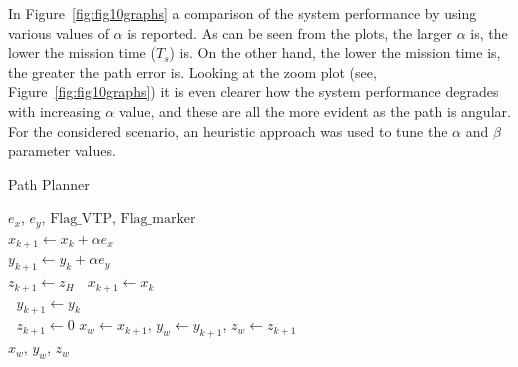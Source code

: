 \documentclass[a4paper,twocolumn,10pt]{article}
\begin{document}
    In Figure~\ref{fig:fig10graphs} a comparison of the system performance by using various values of $\alpha$ is reported. As can be seen from the plots, the larger $\alpha$ is, the lower the mission time ($T_s$) is. On the other hand, the lower the mission time is, the greater the path 
    error is. Looking at the zoom plot (see, Figure~\ref{fig:fig10graphs}) it is even clearer how the system performance degrades with increasing $\alpha$ value, and these are all the more evident as the path is angular. For the considered scenario, an heuristic approach was used to tune the $\alpha$ and $\beta$ parameter values.

    \begin{algorithm}
        \caption{Path Planner}
        \label{alg:pathPlanAlg}
        $e_x$, $e_y$, $\text{Flag\_VTP}$, $\text{Flag\_marker}$ \\
         {
            \quad $x_{k+1} \gets x_k + \alpha e_x$\\
            \quad $y_{k+1} \gets y_k + \alpha e_y$\\
            \quad $z_{k+1} \gets  z_H$
        }
         {
             {
            \qquad $\;$ $x_{k+1}  \gets x_k $\\
            \qquad $\;$ $y_{k+1} \gets y_k $\\
            \qquad $\;$ $z_{k+1} \gets 0$
            }
        }
        $x_w \gets x_{k+1}$, $y_w \gets y_{k+1}$, $z_w \gets z_{k+1}$ \\
        \Return $x_w$, $y_w$, $z_w$
    \end{algorithm} 
\end{document}
